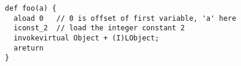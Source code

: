 {\scriptsize \begin{verbatim}
  def foo(a) {
    aload 0   // 0 is offset of first variable, 'a' here
    iconst_2  // load the integer constant 2
    invokevirtual Object + (I)LObject;
    areturn 
  }
\end{verbatim} }
